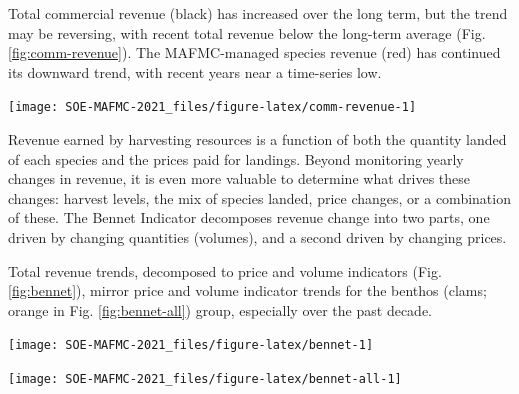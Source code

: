 \documentclass[
  10pt,
]{article}
\let\origfigure\figure
\let\endorigfigure\endfigure
\renewenvironment{figure}[1][2] {
    \expandafter\origfigure\expandafter[H]
} {
    \endorigfigure
}
\begin{document}
Total commercial revenue (black) has increased over the long term, but
the trend may be reversing, with recent total revenue below the
long-term average (Fig. \ref{fig:comm-revenue}). The MAFMC-managed
species revenue (red) has continued its downward trend, with recent
years near a time-series low.

\begin{figure}

{\centering \texttt{[image: SOE-MAFMC-2021\_files/figure-latex/comm-revenue-1]} 

}

\caption{Total revenue for the region (black) and revenue from MAFMC managed species (red).}\label{fig:comm-revenue}
\end{figure}

Revenue earned by harvesting resources is a function of both the
quantity landed of each species and the prices paid for landings. Beyond
monitoring yearly changes in revenue, it is even more valuable to
determine what drives these changes: harvest levels, the mix of species
landed, price changes, or a combination of these. The Bennet Indicator
decomposes revenue change into two parts, one driven by changing
quantities (volumes), and a second driven by changing prices.

Total revenue trends, decomposed to price and volume indicators (Fig.
\ref{fig:bennet}), mirror price and volume indicator trends for the
benthos (clams; orange in Fig. \ref{fig:bennet-all}) group, especially
over the past decade.

\begin{figure}

{\centering \texttt{[image: SOE-MAFMC-2021\_files/figure-latex/bennet-1]} 

}

\caption{Revenue change from the 2015 values in dollars (black), Price (PI), and Volume Indicators (VI) for commercial landings in the Mid-Atlantic Bight.}\label{fig:bennet}
\end{figure}

\begin{figure}

{\centering \texttt{[image: SOE-MAFMC-2021\_files/figure-latex/bennet-all-1]} 

}

\caption{Total component value in dollars (black) for commercial landings in the Mid-Atlantic Bight.}\label{fig:bennet-all}
\end{figure}
\end{document}
